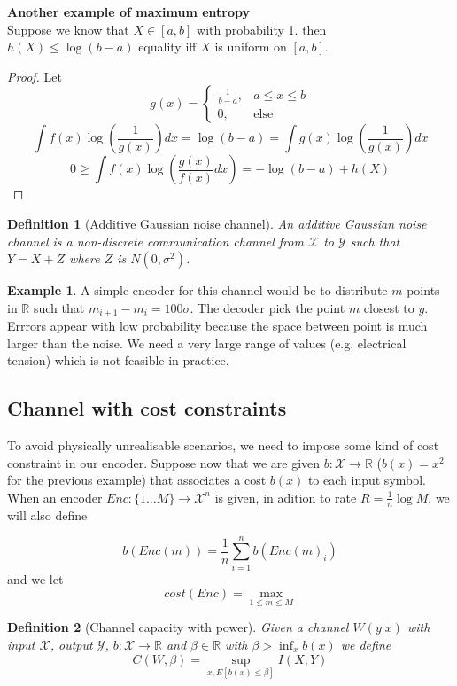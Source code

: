 \documentclass[twoside]{article}
\newtheorem{definition}{Definition}[section]
\theoremstyle{definition} %
\newtheorem{example}{Example}
\newcommand{\Ex}[1]{E\left[#1\right]}
\def\X{\mathcal{X}}
\def\Y{\mathcal{Y}}
\def\R{\mathbb{R}}
\begin{document}
\textbf{Another example of maximum entropy} \\
Suppose we know that $X \in [a, b]$ with probability 1. then $h(X) \leq \log(b - a)$ equality iff $X$ is uniform on $[a, b]$.
\begin{proof}
  Let
  \[
    g(x) =
    \left\{
    \begin{array}{cc}
      \frac{1}{b - a} , & a \leq x \leq b \\
      0 , & \text{else}
    \end{array}
    \right.
\]
\[
  \int f(x) \log(\frac{1}{g(x)}) dx = \log(b - a) = \int g(x) \log(\frac{1}{g(x)}) dx
\]
\[
  0 \geq \int f(x) \log(\frac{g(x)}{f(x)} dx) = - \log(b - a) + h(X)
\]
\end{proof}


\begin{definition}[Additive Gaussian noise channel]
  An additive Gaussian noise channel is a non-discrete communication channel from $\X$ to $\Y$ such that $Y=X+Z$ where $Z$ is $N(0,\sigma^2)$.
\end{definition}

\begin{example}
  A simple encoder for this channel would be to distribute $m$ points in $\R$ such that $m_{i+1} - m_i = 100\sigma$. The decoder pick the point $m$ closest to $y$. Errrors appear with low probability because the space between point is much larger than the noise. We need a very large range of values (e.g. electrical tension) which is not feasible in practice.
\end{example}

\subsection{Channel with cost constraints}

To avoid physically unrealisable scenarios, we need to impose some kind of cost constraint in our encoder. Suppose now that we are given $b : \X \to \R$ ($b(x) = x^2$ for the previous example) that associates a cost $b(x)$ to each input symbol. When an encoder $Enc: \{ 1 \dots M \} \to \X^n$ is given, in adition to rate $R = \frac 1 n \log M$, we will also define

\[
  b(Enc(m)) = \frac 1 n \sum_{i=1}^n b(Enc(m)_i)
\]
and we let
\[
  cost(Enc) = \max_{1\leq m \leq M}
\]

\begin{definition}[Channel capacity with power]
Given a channel $W(y|x)$ with input $\X$, output $\Y$, $b:\X\to \R$ and $\beta \in \R$ with $\beta > \inf_x b(x)$ we define
\[
  C(W, \beta) = \sup_{x, \Ex{b(x) \leq \beta}} I(X;Y)
\]
\end{definition}
\end{document}
